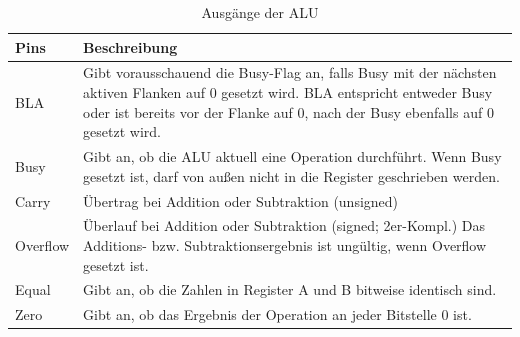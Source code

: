 \begin{table}[h]
  \centering
  \begin{tabular}{|l|p{11cm}|}
    \hline
    \textbf{Pins} & \textbf{Beschreibung}                                               \\
    \hline
    BLA           &
    Gibt vorausschauend die Busy-Flag an, falls Busy mit der nächsten aktiven Flanken
    auf 0 gesetzt wird. BLA entspricht entweder Busy oder ist bereits vor der Flanke auf 0,
    nach der Busy ebenfalls auf 0 gesetzt wird.                                         \\
    \hline
    Busy          & Gibt an, ob die ALU aktuell eine Operation durchführt.
    Wenn Busy gesetzt ist, darf von außen nicht in die Register geschrieben werden.     \\
    \hline
    Carry         & Übertrag bei Addition oder Subtraktion (unsigned)                   \\
    \hline
    Overflow      & Überlauf bei Addition oder Subtraktion (signed; 2er-Kompl.)
    Das Additions- bzw. Subtraktionsergebnis ist ungültig, wenn Overflow gesetzt ist.   \\
    \hline
    Equal         & Gibt an, ob die Zahlen in Register A und B bitweise identisch sind. \\
    \hline
    Zero          & Gibt an, ob das Ergebnis der Operation an jeder Bitstelle 0 ist.    \\
    \hline
  \end{tabular}
  \caption{Ausgänge der ALU}
  \label{fig:Ausgänge der ALU}
\end{table}
